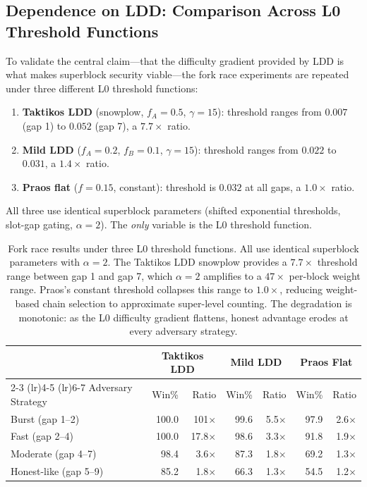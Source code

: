 \documentclass[11pt]{article}
\begin{document}
\subsection{Dependence on LDD: Comparison Across L0 Threshold Functions}
\label{sec:l0comparison}

To validate the central claim---that the difficulty gradient provided by LDD is what makes superblock security viable---the fork race experiments are repeated under three different L0 threshold functions:

\begin{enumerate}
    \item \textbf{Taktikos LDD} (snowplow, $f_A = 0.5$, $\gamma = 15$): threshold ranges from $0.007$ (gap 1) to $0.052$ (gap 7), a $7.7\times$ ratio.
    \item \textbf{Mild LDD} ($f_A = 0.2$, $f_B = 0.1$, $\gamma = 15$): threshold ranges from $0.022$ to $0.031$, a $1.4\times$ ratio.
    \item \textbf{Praos flat} ($f = 0.15$, constant): threshold is $0.032$ at all gaps, a $1.0\times$ ratio.
\end{enumerate}

All three use identical superblock parameters (shifted exponential thresholds, slot-gap gating, $\alpha = 2$). The \emph{only} variable is the L0 threshold function.

\begin{table}[t]
\centering
\begin{tabular}{lrrrrrr}
\toprule
& \multicolumn{2}{c}{Taktikos LDD} & \multicolumn{2}{c}{Mild LDD} & \multicolumn{2}{c}{Praos Flat} \\
\cmidrule(lr){2-3} \cmidrule(lr){4-5} \cmidrule(lr){6-7}
Adversary Strategy & Win\% & Ratio & Win\% & Ratio & Win\% & Ratio \\
\midrule
Burst (gap 1--2) & 100.0 & 101$\times$ & 99.6 & 5.5$\times$ & 97.9 & 2.6$\times$ \\
Fast (gap 2--4) & 100.0 & 17.8$\times$ & 98.6 & 3.3$\times$ & 91.8 & 1.9$\times$ \\
Moderate (gap 4--7) & 98.4 & 3.6$\times$ & 87.3 & 1.8$\times$ & 69.2 & 1.3$\times$ \\
Honest-like (gap 5--9) & 85.2 & 1.8$\times$ & 66.3 & 1.3$\times$ & 54.5 & 1.2$\times$ \\
\bottomrule
\end{tabular}
\caption{Fork race results under three L0 threshold functions. All use identical superblock parameters with $\alpha = 2$. The Taktikos LDD snowplow provides a $7.7\times$ threshold range between gap 1 and gap 7, which $\alpha = 2$ amplifies to a $47\times$ per-block weight range. Praos's constant threshold collapses this range to $1.0\times$, reducing weight-based chain selection to approximate super-level counting. The degradation is monotonic: as the L0 difficulty gradient flattens, honest advantage erodes at every adversary strategy.}
\label{tab:l0comparison}
\end{table}
\end{document}
